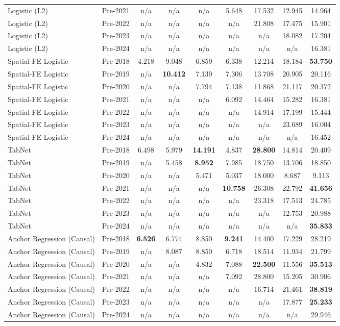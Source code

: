 \begin{table}[htbp]
{\begin{tabular}{l lccccccc}
Logistic (L2) & Pre-2021 & n/a & n/a & n/a & 5.648 & 17.532 & 12.945 & 14.964 \\
Logistic (L2) & Pre-2022 & n/a & n/a & n/a & n/a & 21.808 & 17.475 & 15.901 \\
Logistic (L2) & Pre-2023 & n/a & n/a & n/a & n/a & n/a & 18.082 & 17.204 \\
Logistic (L2) & Pre-2024 & n/a & n/a & n/a & n/a & n/a & n/a & 16.381 \\
Spatial-FE Logistic & Pre-2018 & 4.218 & 9.048 & 6.859 & 6.338 & 12.214 & 18.184 & \textbf{53.750} \\
Spatial-FE Logistic & Pre-2019 & n/a & \textbf{10.412} & 7.139 & 7.306 & 13.708 & 20.905 & 20.116 \\
Spatial-FE Logistic & Pre-2020 & n/a & n/a & 7.794 & 7.138 & 11.868 & 21.117 & 20.372 \\
Spatial-FE Logistic & Pre-2021 & n/a & n/a & n/a & 6.092 & 14.464 & 15.282 & 16.381 \\
Spatial-FE Logistic & Pre-2022 & n/a & n/a & n/a & n/a & 14.914 & 17.199 & 15.444 \\
Spatial-FE Logistic & Pre-2023 & n/a & n/a & n/a & n/a & n/a & 23.689 & 16.004 \\
Spatial-FE Logistic & Pre-2024 & n/a & n/a & n/a & n/a & n/a & n/a & 16.452 \\
TabNet & Pre-2018 & 6.498 & 5.979 & \textbf{14.191} & 4.837 & \textbf{28.800} & 14.814 & 20.409 \\
TabNet & Pre-2019 & n/a & 5.458 & \textbf{8.952} & 7.985 & 18.750 & 13.706 & 18.850 \\
TabNet & Pre-2020 & n/a & n/a & 5.471 & 5.037 & 18.000 & 8.687 & 9.113 \\
TabNet & Pre-2021 & n/a & n/a & n/a & \textbf{10.758} & 26.308 & 22.792 & \textbf{41.656} \\
TabNet & Pre-2022 & n/a & n/a & n/a & n/a & 23.318 & 17.513 & 24.785 \\
TabNet & Pre-2023 & n/a & n/a & n/a & n/a & n/a & 12.753 & 20.988 \\
TabNet & Pre-2024 & n/a & n/a & n/a & n/a & n/a & n/a & \textbf{35.833} \\
Anchor Regression (Causal) & Pre-2018 & \textbf{6.526} & 6.774 & 8.850 & \textbf{9.241} & 14.400 & 17.229 & 28.219 \\
Anchor Regression (Causal) & Pre-2019 & n/a & 8.087 & 8.850 & 6.718 & 18.514 & 11.934 & 21.799 \\
Anchor Regression (Causal) & Pre-2020 & n/a & n/a & 4.832 & 7.088 & \textbf{22.500} & 11.556 & \textbf{35.513} \\
Anchor Regression (Causal) & Pre-2021 & n/a & n/a & n/a & 7.092 & 28.800 & 15.205 & 30.906 \\
Anchor Regression (Causal) & Pre-2022 & n/a & n/a & n/a & n/a & 16.714 & 21.461 & \textbf{38.819} \\
Anchor Regression (Causal) & Pre-2023 & n/a & n/a & n/a & n/a & n/a & 17.877 & \textbf{25.233} \\
Anchor Regression (Causal) & Pre-2024 & n/a & n/a & n/a & n/a & n/a & n/a & 29.946 \\
\bottomrule
\end{tabular}%
}
\end{table}